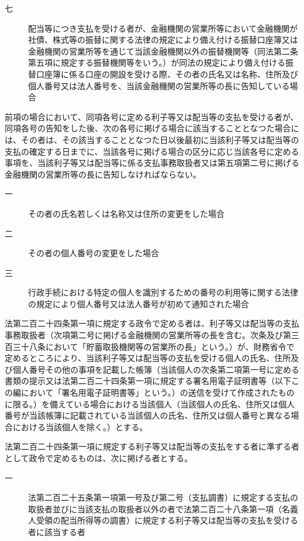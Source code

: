 \documentclass[twocolumn,a4j,10pt]{ltjtarticle}
\begin{document}
\begin{description}
\begin{description}
\item[七]配当等につき支払を受ける者が、金融機関の営業所等において金融機関が社債、株式等の振替に関する法律の規定により備え付ける振替口座簿又は金融機関の営業所等を通じて当該金融機関以外の振替機関等（同法第二条第五項に規定する振替機関等をいう。）が同法の規定により備え付ける振替口座簿に係る口座の開設を受ける際、その者の氏名又は名称、住所及び個人番号又は法人番号を、当該金融機関の営業所等の長に告知している場合
\end{description}
\item[\rensuji{3}]前項の場合において、同項各号に定める利子等又は配当等の支払を受ける者が、同項各号の告知をした後、次の各号に掲げる場合に該当することとなつた場合には、その者は、その該当することとなつた日以後最初に当該利子等又は配当等の支払の確定する日までに、当該各号に掲げる場合の区分に応じ当該各号に定める事項を、当該利子等又は配当等に係る支払事務取扱者又は第五項第二号に掲げる金融機関の営業所等の長に告知しなければならない。
\begin{description}
\item[一]その者の氏名若しくは名称又は住所の変更をした場合
\item[二]その者の個人番号の変更をした場合
\item[三]行政手続における特定の個人を識別するための番号の利用等に関する法律の規定により個人番号又は法人番号が初めて通知された場合
\end{description}
\item[\rensuji{4}]法第二百二十四条第一項に規定する政令で定める者は、利子等又は配当等の支払事務取扱者（次項第二号に掲げる金融機関の営業所等の長を含む。次条及び第三百三十八条において「貯蓄取扱機関等の営業所の長」という。）が、財務省令で定めるところにより、当該利子等又は配当等の支払を受ける個人の氏名、住所及び個人番号その他の事項を記載した帳簿（当該個人の次条第二項第一号に定める書類の提示又は法第二百二十四条第一項に規定する署名用電子証明書等（以下この編において「署名用電子証明書等」という。）の送信を受けて作成されたものに限る。）を備えている場合における当該個人（当該個人の氏名、住所又は個人番号が当該帳簿に記載されている当該個人の氏名、住所又は個人番号と異なる場合における当該個人を除く。）とする。
\item[\rensuji{5}]法第二百二十四条第一項に規定する利子等又は配当等の支払をする者に準ずる者として政令で定めるものは、次に掲げる者とする。
\begin{description}
\item[一]法第二百二十五条第一項第一号及び第二号（支払調書）に規定する支払の取扱者並びに当該支払の取扱者以外の者で法第二百二十八条第一項（名義人受領の配当所得等の調書）に規定する利子等又は配当等の支払を受ける者に該当する者

\end{description}
\end{description}
\end{document}
